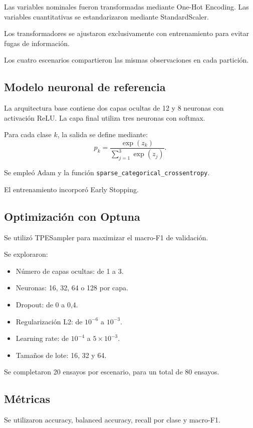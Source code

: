 \documentclass[11pt,a4paper]{article}
\begin{document}
Las variables nominales fueron transformadas
mediante One-Hot Encoding.
Las variables cuantitativas se estandarizaron
mediante StandardScaler.

Los transformadores se ajustaron exclusivamente
con entrenamiento para evitar fugas de información.

Los cuatro escenarios compartieron las mismas
observaciones en cada partición.

\subsection{Modelo neuronal de referencia}

La arquitectura base contiene dos capas ocultas
de 12 y 8 neuronas con activación ReLU.
La capa final utiliza tres neuronas con softmax.

Para cada clase $k$, la salida se define mediante:
\[
p_k =
\frac{\exp(z_k)}
{\sum_{j=1}^{3}\exp(z_j)}.
\]

Se empleó Adam y la función
\texttt{sparse\_categorical\_crossentropy}.

El entrenamiento incorporó Early Stopping.

\subsection{Optimización con Optuna}

Se utilizó TPESampler para maximizar el macro-F1
de validación.

Se exploraron:
\begin{itemize}
\item Número de capas ocultas: de 1 a 3.
\item Neuronas: 16, 32, 64 o 128 por capa.
\item Dropout: de 0 a 0,4.
\item Regularización L2: de $10^{-6}$ a $10^{-3}$.
\item Learning rate: de $10^{-4}$ a $5\times10^{-3}$.
\item Tamaños de lote: 16, 32 y 64.
\end{itemize}

Se completaron 20 ensayos por escenario,
para un total de 80 ensayos.

\subsection{Métricas}

Se utilizaron accuracy, balanced accuracy,
recall por clase y macro-F1.
\end{document}
